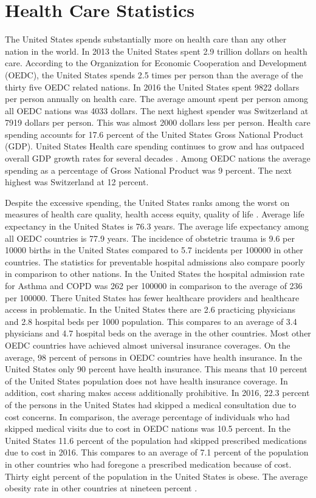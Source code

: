 \documentclass[sigconf]{acmart}
\begin{document}
\section{Health Care Statistics}

The United States spends substantially more on health care than any other nation in the world.  In 2013 the United States spent 2.9 trillion dollars on health care.  According to the Organization for Economic Cooperation and Development (OEDC), the United States spends 2.5 times per person than the average of the thirty five OEDC related nations.  In 2016 the United States spent 9822 dollars per person annually on health care. The average amount spent per person among all OEDC nations was 4033 dollars.  The next highest spender was Switzerland at 7919 dollars per person. This was almost 2000 dollars less per person.  Health care spending accounts for 17.6 percent of the United States Gross National Product (GDP). United States Health care spending continues to grow and has outpaced overall GDP growth rates for several decades \cite{www-google-McDonald}. Among OEDC nations the average spending as a percentage of Gross National Product was 9 percent. The next highest was Switzerland at 12 percent. 

Despite the excessive spending, the United States ranks among the worst on measures of health care quality, health access equity, quality of life \cite{www-google-McDonald}.  Average life expectancy in the United States is 76.3 years.  The average life expectancy among all OEDC countries is 77.9 years. The incidence of obstetric trauma is 9.6 per 10000 births in the United States compared to 5.7 incidents per 100000 in other countries. The statistics for preventable hospital admissions also compare poorly in comparison to other nations. In the United States the hospital admission rate for Asthma and COPD was 262 per 100000 in comparison to the average of 236 per 100000.  There United States has fewer healthcare providers and healthcare access in problematic.  In the United States there are 2.6 practicing physicians and 2.8 hospital beds per 1000 population. This compares to an average of 3.4 physicians and 4.7 hospital beds on the average in the other countries. Most other OEDC countries have achieved almost universal insurance coverages. On the average, 98 percent of persons in OEDC countries have health insurance. In the United States only 90 percent have health insurance. This means that 10 percent of the United States population does not have health insurance coverage. In addition, cost sharing makes access additionally prohibitive.  In 2016, 22.3 percent of the persons in the United States had skipped a medical consultation due to cost concerns. In comparison, the average percentage of individuals who had skipped medical visits due to cost in OEDC nations was 10.5 percent.  In the United States 11.6 percent of the population had skipped prescribed medications due to cost in 2016. This compares to an average of 7.1 percent of the population in other countries who had foregone a prescribed medication because of cost. Thirty eight percent of the population in the United States is obese. The average obesity rate in other countries at nineteen percent \cite{www-google-OEDC}.
\end{document}
